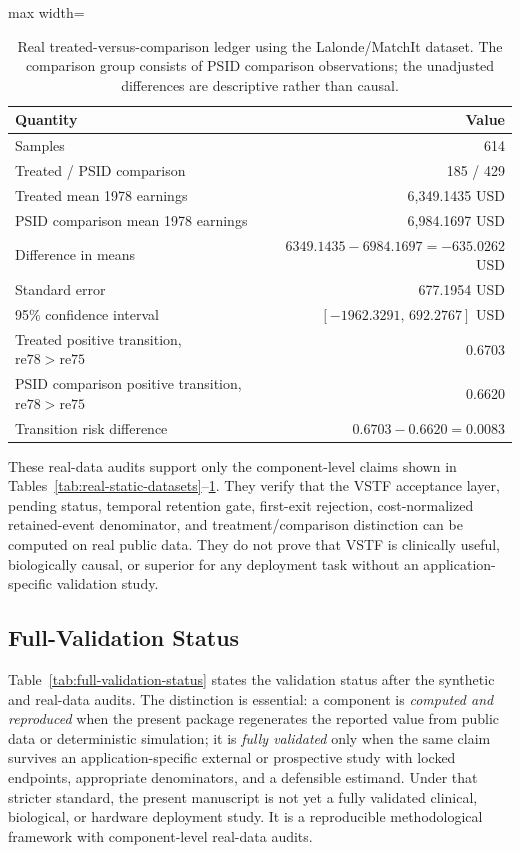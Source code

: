 \documentclass[11pt,a4paper]{article}
\newcommand{\1}{\mathbf{1}}
\begin{document}
\begin{table}[h]
\centering
\caption{Real treated-versus-comparison ledger using the Lalonde/MatchIt dataset. The comparison group consists of PSID comparison observations; the unadjusted differences are descriptive rather than causal.}
\label{tab:lalonde-ledger}
\small
\begin{adjustbox}{max width=\linewidth}
\begin{tabular}{lr}
\toprule
Quantity & Value \\
\midrule
Samples & 614 \\
Treated / PSID comparison & 185 / 429 \\
Treated mean 1978 earnings & 6,349.1435 USD \\
PSID comparison mean 1978 earnings & 6,984.1697 USD \\
Difference in means & $6349.1435-6984.1697=-635.0262$ USD \\
Standard error & 677.1954 USD \\
95\% confidence interval & $[-1962.3291,\,692.2767]$ USD \\
Treated positive transition, $\mathrm{re78}>\mathrm{re75}$ & 0.6703 \\
PSID comparison positive transition, $\mathrm{re78}>\mathrm{re75}$ & 0.6620 \\
Transition risk difference & $0.6703-0.6620=0.0083$ \\
\bottomrule
\end{tabular}
\end{adjustbox}
\end{table}

These real-data audits support only the component-level claims shown in Tables~\ref{tab:real-static-datasets}--\ref{tab:lalonde-ledger}. They verify that the VSTF acceptance layer, pending status, temporal retention gate, first-exit rejection, cost-normalized retained-event denominator, and treatment/comparison distinction can be computed on real public data. They do not prove that VSTF is clinically useful, biologically causal, or superior for any deployment task without an application-specific validation study.

\subsection{Full-Validation Status}

Table~\ref{tab:full-validation-status} states the validation status after the synthetic and real-data audits. The distinction is essential: a component is \emph{computed and reproduced} when the present package regenerates the reported value from public data or deterministic simulation; it is \emph{fully validated} only when the same claim survives an application-specific external or prospective study with locked endpoints, appropriate denominators, and a defensible estimand. Under that stricter standard, the present manuscript is not yet a fully validated clinical, biological, or hardware deployment study. It is a reproducible methodological framework with component-level real-data audits.
\end{document}
